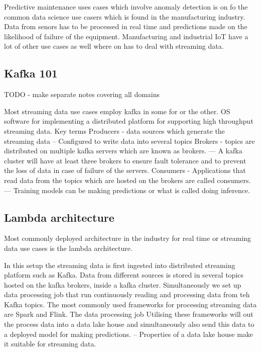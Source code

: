 \documentclass[a4paper, 11pt]{article}
\begin{document}
    Predictive maintenance uses cases which involve anomaly detection is on fo the common data science use casers which is found in the manufacturing industry.
    Data from senors has to be processed in real time and predictions made on the likelihood of failure of the equipment.
    Manufacturing and industrial IoT have a lot of other use cases as well where on has to deal with streaming data.

    \subsection{Kafka 101}

    TODO - make separate notes covering all domains

    Most streaming data use cases employ kafka in some for or the other.
    OS software for implementing a distributed platform for supporting high throughput streaming data.
    Key terms
    Producers - data sources which generate the streaming data
    -- Configured to write data into several topics
    Brokers - topics are distributed on multiple kafka servers which are known as brokers.
    --- A kafka cluster will have at least three brokers to ensure fault tolerance and to prevent the loss of data in case of failure of the servers.
    Consumers - Applications that read data from the topics which are hosted on the brokers are called consumers.
    --- Training models can be making predictions or what is called doing inference.

    \subsection{Lambda architecture}
    Most commonly deployed architecture in the industry for real time or streaming data use cases is the lambda architecture.

    In this setup the streaming data is first ingested into distributed streaming platform such as Kafka.
    Data from different sources is stored in several topics hosted on the kafka brokers, inside a kafka cluster.
    Simultaneously we set up data processing job that run continuously reading and processing data from teh Kafka topics.
    The most commonly used frameworks for processing streaming data are Spark and Flink.
    The data processing job Utilising these frameworks will out the process data into a data lake house and simultaneously also send this data to a deployed model for making predictions.
    -- Properties of a data lake house make it suitable for streaming data.
\end{document}

